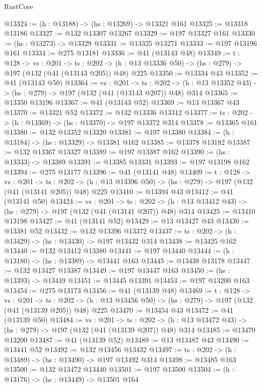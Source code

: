\begin{lexlean}{RustCore}
\begin{coremodule}
@13324 := (h : @13188) -> (hs : @13269) -> @13321 @161
@13325 := @13318 @13186
@13327 := @132 @13307 @13267
@13329 := @197 @13327 @161
@13330 := (hs : @13273) -> @13329
@13331 := @13325 @13271
@13333 := @197 @13196 @161
@13334 := @275 @13181
@13336 := @41 (@13143 @48)
@13349 := {t : @128} ->
  {vs : @201} ->
  {ts : @202} -> (h : @13 @13336 @50) -> (hs : @279) -> @197 (@132 (@41 (@13143 @205)) @48) @225
@13350 := @13334 @43
@13352 := @41 (@13143 @50)
@13364 := {vs : @201} ->
  {ts : @202} -> (h : @13 @13352 @43) -> (hs : @279) -> @197 (@132 (@41 (@13143 @207)) @48) @314
@13365 := @13350 @13196
@13367 := @41 (@13143 @52)
@13369 := @13 @13367 @43
@13370 := @13321 @52
@13372 := @132 @13336 @13312
@13377 := {ts : @202} -> (h : @13369) -> (hs : @13370) -> @197 @13372 @314
@13378 := @13365 @161
@13380 := @132 @13352 @13320
@13381 := @197 @13380
@13384 := (h : @13184) -> (hs : @13329) -> @13381 @162
@13385 := @13378 @13182
@13387 := @132 @13367 @13327
@13389 := @197 @13387 @162
@13390 := (hs : @13333) -> @13389
@13391 := @13385 @13331
@13393 := @197 @13198 @162
@13394 := @275 @13177
@13396 := @41 (@13141 @48)
@13409 := {t : @128} ->
  {vs : @201} ->
  {ts : @202} -> (h : @13 @13396 @50) -> (hs : @279) -> @197 (@132 (@41 (@13141 @205)) @48) @225
@13410 := @13394 @43
@13412 := @41 (@13141 @50)
@13424 := {vs : @201} ->
  {ts : @202} -> (h : @13 @13412 @43) -> (hs : @279) -> @197 (@132 (@41 (@13141 @207)) @48) @314
@13425 := @13410 @13198
@13427 := @41 (@13141 @52)
@13429 := @13 @13427 @43
@13430 := @13381 @52
@13432 := @132 @13396 @13372
@13437 := {ts : @202} -> (h : @13429) -> (hs : @13430) -> @197 @13432 @314
@13438 := @13425 @162
@13440 := @132 @13412 @13380
@13441 := @197 @13440
@13444 := (h : @13180) -> (hs : @13389) -> @13441 @163
@13445 := @13438 @13178
@13447 := @132 @13427 @13387
@13449 := @197 @13447 @163
@13450 := (hs : @13393) -> @13449
@13451 := @13445 @13391
@13453 := @197 @13200 @163
@13454 := @275 @13173
@13456 := @41 (@13139 @48)
@13469 := {t : @128} ->
  {vs : @201} ->
  {ts : @202} -> (h : @13 @13456 @50) -> (hs : @279) -> @197 (@132 (@41 (@13139 @205)) @48) @225
@13470 := @13454 @43
@13472 := @41 (@13139 @50)
@13484 := {vs : @201} ->
  {ts : @202} -> (h : @13 @13472 @43) -> (hs : @279) -> @197 (@132 (@41 (@13139 @207)) @48) @314
@13485 := @13470 @13200
@13487 := @41 (@13139 @52)
@13489 := @13 @13487 @43
@13490 := @13441 @52
@13492 := @132 @13456 @13432
@13497 := {ts : @202} -> (h : @13489) -> (hs : @13490) -> @197 @13492 @314
@13498 := @13485 @163
@13500 := @132 @13472 @13440
@13501 := @197 @13500
@13504 := (h : @13176) -> (hs : @13449) -> @13501 @164

\end{coremodule}
\end{lexlean}
